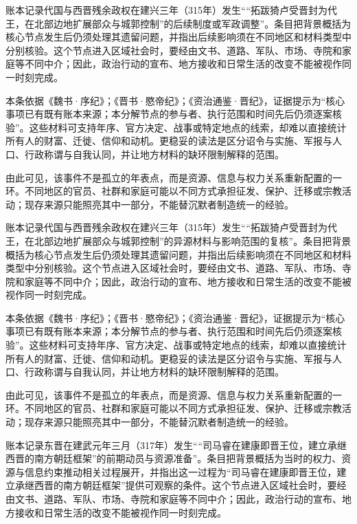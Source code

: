 账本记录代国与西晋残余政权在建兴三年（315年）发生““拓跋猗卢受晋封为代王，在北部边地扩展部众与城郭控制”的后续制度或军政调整”。条目把背景概括为核心节点发生后仍须处理其遗留问题，并指出后续影响须在不同地区和材料类型中分别核验。这个节点进入区域社会时，要经由文书、道路、军队、市场、寺院和家庭等不同中介；因此，政治行动的宣布、地方接收和日常生活的改变不能被视作同一时刻完成。

本条依据《魏书·序纪》；《晋书·愍帝纪》；《资治通鉴·晋纪》，证据提示为“核心事项已有既有账本来源；本分解节点的参与者、执行范围和时间先后仍须逐案核验”。这些材料可支持年序、官方决定、战事或特定地点的线索，却难以直接统计所有人的财富、迁徙、信仰和动机。更稳妥的读法是区分诏令与实施、军报与人口、行政称谓与自我认同，并让地方材料的缺环限制解释的范围。

由此可见，该事件不是孤立的年表点，而是资源、信息与权力关系重新配置的一环。不同地区的官员、社群和家庭可能以不同方式承担征发、保护、迁移或宗教活动；现存来源只能照亮其中一部分，不能替沉默者制造统一的经验。

账本记录代国与西晋残余政权在建兴三年（315年）发生““拓跋猗卢受晋封为代王，在北部边地扩展部众与城郭控制”的异源材料与影响范围的复核”。条目把背景概括为核心节点发生后仍须处理其遗留问题，并指出后续影响须在不同地区和材料类型中分别核验。这个节点进入区域社会时，要经由文书、道路、军队、市场、寺院和家庭等不同中介；因此，政治行动的宣布、地方接收和日常生活的改变不能被视作同一时刻完成。

本条依据《魏书·序纪》；《晋书·愍帝纪》；《资治通鉴·晋纪》，证据提示为“核心事项已有既有账本来源；本分解节点的参与者、执行范围和时间先后仍须逐案核验”。这些材料可支持年序、官方决定、战事或特定地点的线索，却难以直接统计所有人的财富、迁徙、信仰和动机。更稳妥的读法是区分诏令与实施、军报与人口、行政称谓与自我认同，并让地方材料的缺环限制解释的范围。

由此可见，该事件不是孤立的年表点，而是资源、信息与权力关系重新配置的一环。不同地区的官员、社群和家庭可能以不同方式承担征发、保护、迁移或宗教活动；现存来源只能照亮其中一部分，不能替沉默者制造统一的经验。

账本记录东晋在建武元年三月（317年）发生““司马睿在建康即晋王位，建立承继西晋的南方朝廷框架”的前期动员与资源准备”。条目把背景概括为当时的权力、资源与信息约束推动相关过程展开，并指出这一过程为“司马睿在建康即晋王位，建立承继西晋的南方朝廷框架”提供可观察的条件。这个节点进入区域社会时，要经由文书、道路、军队、市场、寺院和家庭等不同中介；因此，政治行动的宣布、地方接收和日常生活的改变不能被视作同一时刻完成。

